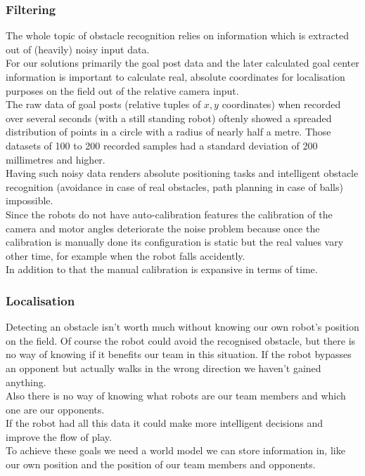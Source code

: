 \documentclass[lnicst,a4paper]{svmultln}
\begin{document}
\subsubsection{Filtering}
The whole topic of obstacle recognition relies on information which is extracted out of (heavily) noisy input data.
\\
For our solutions primarily the goal post data and the later calculated goal center information is important to calculate real, absolute coordinates for localisation purposes on the field out of the relative camera input.
\\
The raw data of goal posts (relative tuples of $x, y$ coordinates) when recorded over several seconds (with a still standing robot) oftenly showed a spreaded distribution of points in a circle with a radius of nearly half a metre. Those datasets of 100 to 200 recorded samples had a standard deviation of 200 millimetres and higher.
\\
Having such noisy data renders absolute positioning tasks and intelligent obstacle recognition (avoidance in case of real obstacles, path planning in case of balls) impossible.
\\
Since the robots do not have auto-calibration features the calibration of the camera and motor angles deteriorate the noise problem because once the calibration is manually done its configuration is static but the real values vary other time, for example when the robot falls accidently.
\\
In addition to that the manual calibration is expansive in terms of time.

\subsubsection{Localisation}
Detecting an obstacle isn't worth much without knowing our own robot's position on the field. Of course the robot could avoid the recognised obstacle, but there is no way of knowing if it benefits our team in this situation. If the robot bypasses an opponent but actually walks in the wrong direction we haven't gained anything. 
\\
Also there is no way of knowing what robots are our team members and which one are our opponents.
\\
If the robot had all this data it could make more intelligent decisions and improve the flow of play.
\\
To achieve these goals we need a world model we can store information in, like our own position and the position of our team members and opponents.
\end{document}
